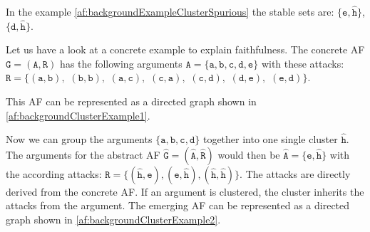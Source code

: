 In the example \cref{af:backgroundExampleClusterSpurious} the stable sets are:
$\mathtt{\{e, \hat{h}}\}$,
$\mathtt{\{d, \hat{h}}\}$.

\vspace{0.5cm}
\noindent
Let us have a look at a concrete example to explain faithfulness. The concrete AF $\mathtt{G=(A, R)}$ has the following arguments $\mathtt{A=\{a, b, c, d, e\}}$ with these attacks:
$\mathtt{R=\{(a,b),}$
$\mathtt{(b,b),}$
$\mathtt{(a,c),}$
$\mathtt{(c,a),}$
$\mathtt{(c,d),}$
$\mathtt{(d,e),}$
$\mathtt{(e,d)\}}$.

This AF can be represented as a directed graph shown in \cref{af:backgroundClusterExample1}.

Now we can group the arguments $\mathtt{\{a, b, c, d\}}$ together into one single cluster $\mathtt{\hat{h}}$. The arguments for the abstract AF $\mathtt{\hat{G} = (\hat{A}, \hat{R})}$ would then be $\mathtt{\hat{A}=\{e, \hat{h}\}}$ with the according attacks:
$\mathtt{\hat{R}=\{(\hat{h}, e), (e, \hat{h}), (\hat{h}, \hat{h})\}}$. The attacks are directly derived from the concrete AF. If an argument is clustered, the cluster inherits the attacks from the argument. The emerging AF can be represented as a directed graph shown in \cref{af:backgroundClusterExample2}.


